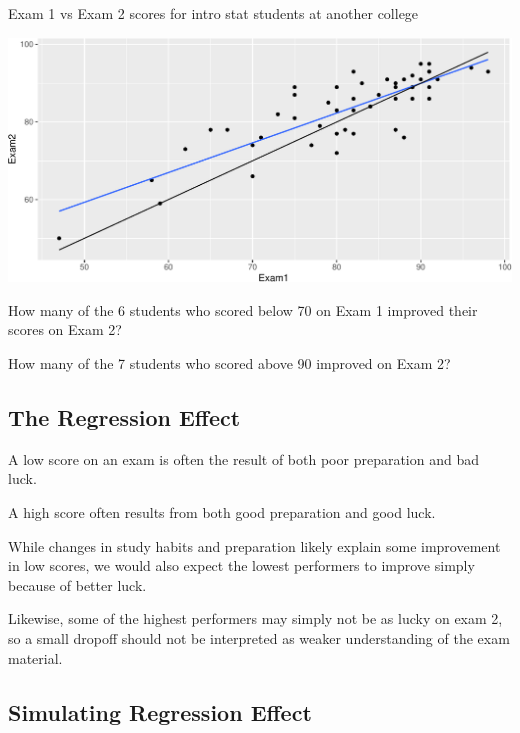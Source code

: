 \documentclass[
  letterpaper,
  DIV=11,
  numbers=noendperiod]{scrreprt}
\begin{document}
Exam 1 vs Exam 2 scores for intro stat students at another college

\includegraphics{Ch4_files/figure-pdf/unnamed-chunk-89-1.pdf}

How many of the 6 students who scored below 70 on Exam 1 improved their
scores on Exam 2?

How many of the 7 students who scored above 90 improved on Exam 2?

\subsection{The Regression Effect}\label{the-regression-effect-3}

A low score on an exam is often the result of both poor preparation and
bad luck.

A high score often results from both good preparation and good luck.

While changes in study habits and preparation likely explain some
improvement in low scores, we would also expect the lowest performers to
improve simply because of better luck.

Likewise, some of the highest performers may simply not be as lucky on
exam 2, so a small dropoff should not be interpreted as weaker
understanding of the exam material.

\subsection{Simulating Regression
Effect}\label{simulating-regression-effect}
\end{document}
